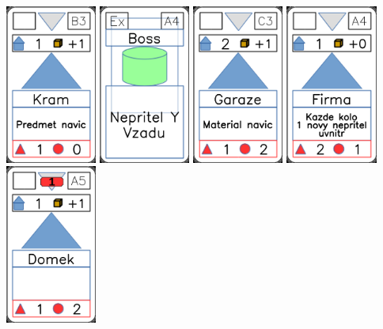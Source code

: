 \documentclass[a4paper]{article}
\begin{document}
	\includegraphics[width=3.0cm]{img-3_7}
	\includegraphics[width=3.0cm]{img-4_3}
	\includegraphics[width=3.0cm]{img-3_12}
	\includegraphics[width=3.0cm]{img-3_18}
	\includegraphics[width=3.0cm]{img-3_4}
\end{document}
